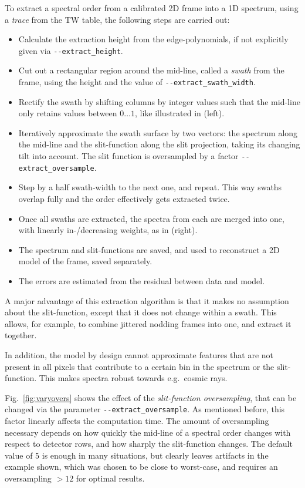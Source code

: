 To extract a spectral order from a calibrated 2D frame into a 1D spectrum, using
a \emph{trace} from the TW table, the following steps are carried out:
\begin{itemize}
    \item Calculate the extraction height from the edge-polynomials, if not
    explicitly given via \texttt{-{}-extract\_height}.
    \item Cut out a rectangular region around the mid-line, called a
    \emph{swath} from the frame, using the height and the value of
    \texttt{-{}-extract\_swath\_width}.
    \item Rectify the swath by shifting columns by integer values such that the
    mid-line only retains values between $0\ldots 1$, like illustrated in
     (left).
    \item Iteratively approximate the swath surface by two vectors: the spectrum
    along the mid-line and the slit-function along the slit projection, taking
    its changing tilt into account. The slit function is oversampled by a factor
    \verb!--extract_oversample!.
    \item Step by a half swath-width to the next one, and repeat. This way
    swaths overlap fully and the order effectively gets extracted twice.
    \item Once all swaths are extracted, the spectra from each are merged into
    one, with linearly in-/decreasing weights, as in 
    (right).
    \item The spectrum and slit-functions are saved, and used to reconstruct a
    2D model of the frame, saved separately.
    \item The errors are estimated from the residual between data and model.
\end{itemize}

A major advantage of this extraction algorithm is that it makes no assumption
about the slit-function, except that it does not change within a swath. This
allows, for example, to combine jittered nodding frames into one, and extract it
together.

In addition, the model by design cannot approximate features that are not
present in all pixels that contribute to a certain bin in the spectrum or the
slit-function. This makes spectra robust towards e.g.~cosmic rays.

Fig.~\ref{fig:varyovers} shows the effect of the \emph{slit-function
oversampling}, that can be changed via  the parameter \linebreak
\verb!--extract_oversample!. As mentioned before, this factor linearly affects
the computation time. The amount of oversampling necessary depends on how
quickly the mid-line of a spectral order changes with respect to detector rows,
and how sharply the slit-function changes. The default value of $5$ is enough in
many situations, but clearly leaves artifacts in the example shown, which was
chosen to be close to worst-case, and requires an oversampling $>12$ for optimal
results.

